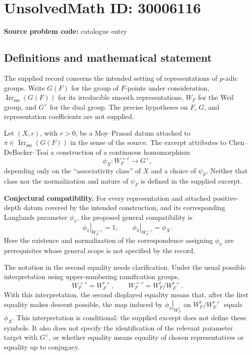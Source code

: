 \documentclass[11pt]{article}
\begin{document}
\section*{UnsolvedMath ID: 30006116}
\textbf{Source problem code:} catalogue entry
\subsection{Definitions and mathematical statement}
The supplied record concerns the intended setting of representations of \(p\)-adic groups. Write \(G(F)\) for the group of \(F\)-points under consideration, \(\operatorname{Irr}_{\mathrm{sm}}(G(F))\) for its irreducible smooth representations, \(W_F\) for the Weil group, and \(G^\vee\) for the dual group. The precise hypotheses on \(F\), \(G\), and representation coefficients are not supplied.

Let \((X,r)\), with \(r>0\), be a Moy--Prasad datum attached to \(\pi\in\operatorname{Irr}_{\mathrm{sm}}(G(F))\) in the sense of the source. The excerpt attributes to Chen--DeBacker--Tsai a construction of a continuous homomorphism
\[
\phi_X:W_F^{=r}\longrightarrow G^\vee,
\]
depending only on the ``associativity class'' of \(X\) and a choice of \(\psi_F\). Neither that class nor the normalization and nature of \(\psi_F\) is defined in the supplied excerpt.

\textbf{Conjectural compatibility.} For every representation and attached positive-depth datum covered by the intended construction, and its corresponding Langlands parameter \(\phi_\pi\), the proposed general compatibility is
\[
\left.\phi_\pi\right|_{W_F^{>r}}=1,
\qquad
\left.\phi_\pi\right|_{W_F^{=r}}=\phi_X.
\]
Here the existence and normalization of the correspondence assigning \(\phi_\pi\) are prerequisites whose general scope is not specified by the record.

The notation in the second equality needs clarification. Under the usual possible interpretation using upper-numbering ramification groups,
\[
W_F^{>r}=W_F^{r+},\qquad
W_F^{=r}=W_F^r/W_F^{r+}.
\]
With this interpretation, the second displayed equality means that, after the first equality makes descent possible, the map induced by \(\left.\phi_\pi\right|_{W_F^r}\) on \(W_F^r/W_F^{r+}\) equals \(\phi_X\). This interpretation is conditional: the supplied excerpt does not define these symbols. It also does not specify the identification of the relevant parameter target with \(G^\vee\), or whether equality means equality of chosen representatives or equality up to conjugacy.
\end{document}

